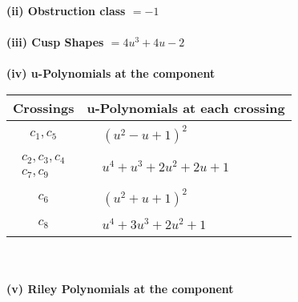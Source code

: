 \documentclass[1p]{elsarticle_modified}
\theoremstyle{definition}
\begin{document}
\flushleft \textbf{(ii) Obstruction class $= -1$}\\~\\
\flushleft \textbf{(iii) Cusp Shapes $= 4 u^3+4 u-2$}\\~\\
\newpage\renewcommand{\arraystretch}{1}
\flushleft \textbf{(iv) u-Polynomials at the component}\newline \\
\begin{tabular}{m{50pt}|m{274pt}}
Crossings & \hspace{64pt}u-Polynomials at each crossing \\
\hline $$\begin{aligned}c_{1},c_{5}\end{aligned}$$&$\begin{aligned}
&(u^2- u+1)^2
\end{aligned}$\\
\hline $$\begin{aligned}c_{2},c_{3},c_{4}\\c_{7},c_{9}\end{aligned}$$&$\begin{aligned}
&u^4+u^3+2 u^2+2 u+1
\end{aligned}$\\
\hline $$\begin{aligned}c_{6}\end{aligned}$$&$\begin{aligned}
&(u^2+u+1)^2
\end{aligned}$\\
\hline $$\begin{aligned}c_{8}\end{aligned}$$&$\begin{aligned}
&u^4+3 u^3+2 u^2+1
\end{aligned}$\\
\hline
\end{tabular}\\~\\
\newpage\renewcommand{\arraystretch}{1}
\flushleft \textbf{(v) Riley Polynomials at the component}\newline \\
\end{document}
